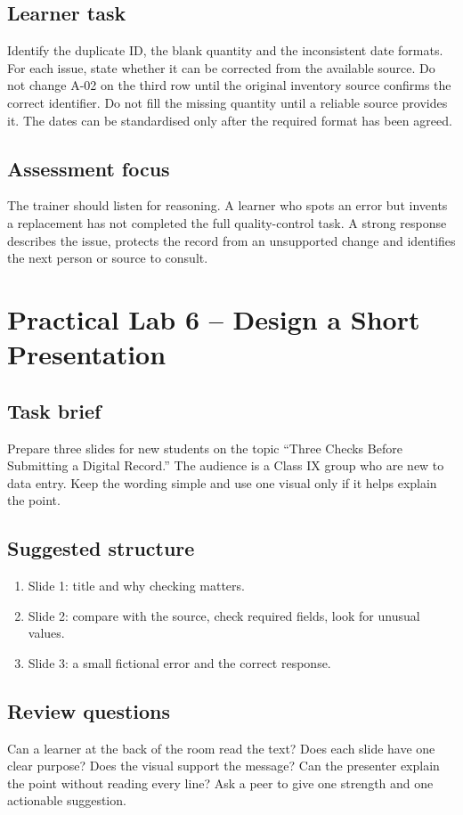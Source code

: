 \documentclass[11pt,openany,oneside]{book}
\begin{document}
\section{Learner task}
Identify the duplicate ID, the blank quantity and the inconsistent date formats. For each issue, state whether it can be corrected from the available source. Do not change A-02 on the third row until the original inventory source confirms the correct identifier. Do not fill the missing quantity until a reliable source provides it. The dates can be standardised only after the required format has been agreed.
\section{Assessment focus}
The trainer should listen for reasoning. A learner who spots an error but invents a replacement has not completed the full quality-control task. A strong response describes the issue, protects the record from an unsupported change and identifies the next person or source to consult.

\chapter{Practical Lab 6 -- Design a Short Presentation}
\section{Task brief}
Prepare three slides for new students on the topic “Three Checks Before Submitting a Digital Record.” The audience is a Class IX group who are new to data entry. Keep the wording simple and use one visual only if it helps explain the point.
\section{Suggested structure}
\begin{enumerate}
\item Slide 1: title and why checking matters.
\item Slide 2: compare with the source, check required fields, look for unusual values.
\item Slide 3: a small fictional error and the correct response.
\end{enumerate}
\section{Review questions}
Can a learner at the back of the room read the text? Does each slide have one clear purpose? Does the visual support the message? Can the presenter explain the point without reading every line? Ask a peer to give one strength and one actionable suggestion.
\end{document}
